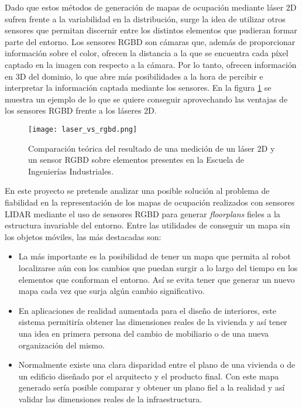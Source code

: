 Dado que estos métodos de generación de mapas de ocupación mediante láser 2D sufren frente a la variabilidad en la distribución, surge la idea de utilizar otros sensores que permitan discernir entre los distintos elementos que pudieran formar parte del entorno. Los sensores RGBD son cámaras que, además de proporcionar información sobre el color, ofrecen la distancia a la que se encuentra cada píxel captado en la imagen con respecto a la cámara. Por lo tanto, ofrecen información en 3D del dominio, lo que abre más posibilidades a la hora de percibir e interpretar la información captada mediante los sensores. En la figura \ref{fig:laser_vs_rgbd} se muestra un ejemplo de lo que se quiere conseguir aprovechando las ventajas de los sensores RGBD frente a los láseres 2D.\\

\begin{figure}[H]
	\begin{center} 
	\texttt{[image: laser\_vs\_rgbd.png]}
	\end{center}
	\caption{Comparación teórica del resultado de una medición de un láser 2D y un sensor RGBD sobre elementos presentes en la Escuela de Ingenierías Industriales.}
	\label{fig:laser_vs_rgbd}
\end{figure}

En este proyecto se pretende analizar una posible solución al problema de fiabilidad en la representación de los mapas de ocupación realizados con sensores LIDAR mediante el uso de sensores RGBD para generar \textit{floorplans} fieles a la estructura invariable del entorno. Entre las utilidades de conseguir un mapa sin los objetos móviles, las más destacadas son:

\begin{itemize}

	\item La más importante es la posibilidad de tener un mapa que permita al robot localizarse aún con los cambios que puedan surgir a lo largo del tiempo en los elementos que conforman el entorno. Así se evita tener que generar un nuevo mapa cada vez que surja algún cambio significativo.
	\item En aplicaciones de realidad aumentada para el diseño de interiores, este sistema permitiría obtener las dimensiones reales de la vivienda y así tener una idea en primera persona del cambio de mobiliario o de una nueva organización del mismo.
	\item Normalmente existe una clara disparidad entre el plano de una vivienda o de un edificio diseñado por el arquitecto y el producto final. Con este mapa generado sería posible comparar y obtener un plano fiel a la realidad y así validar las dimensiones reales de la infraestructura.

\end{itemize}



